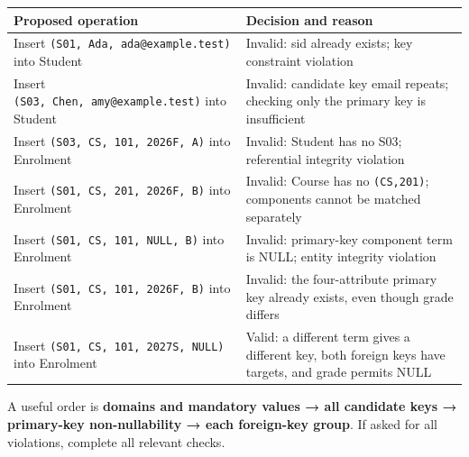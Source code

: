 \begin{longtable}[]{@{}
  >{\raggedright\arraybackslash}p{}
  >{\raggedright\arraybackslash}p{}@{}}
\toprule\noalign{}
\begin{minipage}[b]{\linewidth}\raggedright
Proposed operation
\end{minipage} & \begin{minipage}[b]{\linewidth}\raggedright
Decision and reason
\end{minipage} \\
\midrule\noalign{}
\endhead
\bottomrule\noalign{}
\endlastfoot
Insert \texttt{(\allowbreak{}S01,\allowbreak{}\ Ada,\allowbreak{}\ ada@example.\allowbreak{}test)\allowbreak{}} into Student & Invalid: sid already exists; key constraint violation \\
Insert \texttt{(\allowbreak{}S03,\allowbreak{}\ Chen,\allowbreak{}\ amy@example.\allowbreak{}test)\allowbreak{}} into Student & Invalid: candidate key email repeats; checking only the primary key is insufficient \\
Insert \texttt{(\allowbreak{}S03,\allowbreak{}\ CS,\allowbreak{}\ 101,\allowbreak{}\ 2026F,\allowbreak{}\ A)\allowbreak{}} into Enrolment & Invalid: Student has no S03; referential integrity violation \\
Insert \texttt{(\allowbreak{}S01,\allowbreak{}\ CS,\allowbreak{}\ 201,\allowbreak{}\ 2026F,\allowbreak{}\ B)\allowbreak{}} into Enrolment & Invalid: Course has no \texttt{(\allowbreak{}CS,\allowbreak{}201)\allowbreak{}}; components cannot be matched separately \\
Insert \texttt{(\allowbreak{}S01,\allowbreak{}\ CS,\allowbreak{}\ 101,\allowbreak{}\ NULL,\allowbreak{}\ B)\allowbreak{}} into Enrolment & Invalid: primary-key component term is NULL; entity integrity violation \\
Insert \texttt{(\allowbreak{}S01,\allowbreak{}\ CS,\allowbreak{}\ 101,\allowbreak{}\ 2026F,\allowbreak{}\ B)\allowbreak{}} into Enrolment & Invalid: the four-attribute primary key already exists, even though grade differs \\
Insert \texttt{(\allowbreak{}S01,\allowbreak{}\ CS,\allowbreak{}\ 101,\allowbreak{}\ 2027S,\allowbreak{}\ NULL)\allowbreak{}} into Enrolment & Valid: a different term gives a different key, both foreign keys have targets, and grade permits NULL \\
\end{longtable}

A useful order is \textbf{domains and mandatory values → all candidate keys → primary-key non-nullability → each foreign-key group}. If asked for all violations, complete all relevant checks.

